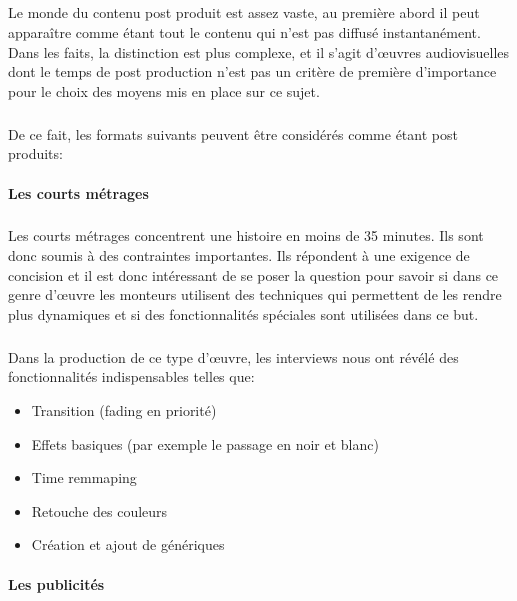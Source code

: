 \subparagraph{}

Le monde du contenu post produit est assez vaste, au première abord
il peut apparaître comme étant tout le contenu qui n'est pas diffusé
instantanément. Dans les faits, la distinction est plus complexe, et il
s'agit d'œuvres audiovisuelles dont le temps de post production n'est
pas un critère de première d'importance pour le choix des moyens mis
en place sur ce sujet.

\subparagraph{}

De ce fait, les formats suivants peuvent être considérés comme étant
post produits:

\paragraph{Les courts métrages}

\subparagraph{}

Les courts métrages concentrent une histoire en moins de 35 minutes. Ils
sont donc soumis à des contraintes importantes. Ils répondent à
une exigence de concision et il est donc intéressant de se poser la
question pour savoir si dans ce genre d'œuvre les monteurs utilisent
des techniques qui permettent de les rendre plus dynamiques et si des
fonctionnalités spéciales sont utilisées dans ce but.

\subparagraph{}

Dans la production de ce type d'œuvre, les interviews nous ont révélé
des fonctionnalités indispensables telles que:

\begin{itemize} \setlength{\itemsep}{2mm}

  \item{Transition (fading en priorité)}

  \item{Effets basiques (par exemple le passage en noir et blanc)}

  \item{Time remmaping}

  \item{Retouche des couleurs}

  \item{Création et ajout de génériques}

\end{itemize}

\paragraph {Les publicités}

